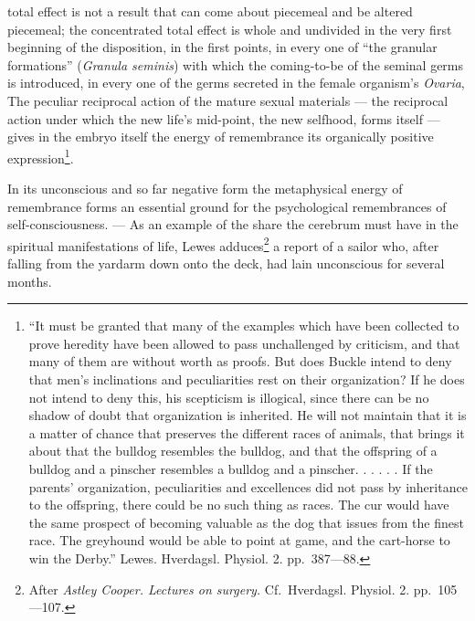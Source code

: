 \documentclass[12pt,a4paper]{book}
\begin{document}
\setcounter{footnote}{0}
total effect is not a result that can come about piecemeal and be altered
piecemeal; the concentrated total effect is whole and undivided in the very first
beginning of the disposition, in the first points, in every one of ``the granular
formations'' (\textit{Granula seminis}) with which the coming-to-be of the
seminal germs is introduced, in every one of the germs secreted in the female
organism's \textit{Ovaria},
The peculiar reciprocal action of the mature sexual materials --- the reciprocal
action under which the new life's mid-point, the new selfhood, forms itself ---
gives in the embryo itself the energy of remembrance its organically positive
expression\footnote{``It must be granted that many of the examples which have
been collected to prove heredity have been allowed to pass unchallenged by
criticism, and that many of them are without worth as proofs. But does Buckle
intend to deny that men's inclinations and peculiarities rest on their
organization? If he does not intend to deny this, his scepticism is illogical,
since there can be no shadow of doubt that organization is inherited. He will not
maintain that it is a matter of chance that preserves the different races of
animals, that brings it about that the bulldog resembles the bulldog, and that
the offspring of a bulldog and a pinscher resembles a bulldog and a pinscher.
. . . . . If the parents' organization, peculiarities and excellences did not
pass by inheritance to the offspring, there could be no such thing as races. The
cur would have the same prospect of becoming valuable as the dog that issues
from the finest race. The greyhound would be able to point at game, and the
cart-horse to win the Derby.'' Lewes. Hverdagsl. Physiol. 2. pp.~387---88.}.

In its unconscious and so far negative form the metaphysical energy of
remembrance forms an essential ground for the psychological remembrances of
self-consciousness. --- As an example of the share the cerebrum must have in the
spiritual manifestations of life, Lewes adduces\footnote{After \textit{Astley
Cooper. Lectures on surgery.} Cf.\ Hverdagsl. Physiol. 2. pp.~105---107.} a
report of a sailor who, after falling from the yardarm down onto the deck, had
lain unconscious for several months.
\end{document}
